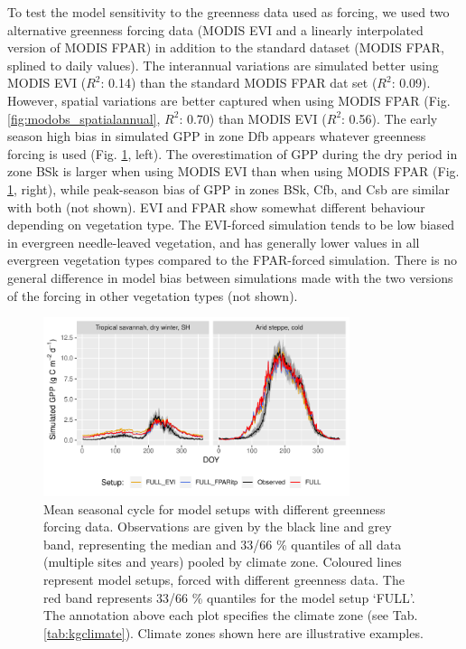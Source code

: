 \documentclass{myreport}
\newcommand{\rsq}{$R^2$}
\begin{document}
To test the model sensitivity to the greenness data used as forcing, we used two alternative greenness forcing data (MODIS EVI and a linearly interpolated version of MODIS FPAR) in addition to the standard dataset (MODIS FPAR, splined to daily values). 
The interannual variations are simulated better using MODIS EVI  (\rsq : 0.14) than the standard MODIS FPAR dat set (\rsq : 0.09). However, spatial variations are better captured when using MODIS FPAR (Fig. \ref{fig:modobs_spatialannual}, \rsq : 0.70) than MODIS EVI (\rsq : 0.56). The early season high bias in simulated GPP in zone Dfb appears whatever greenness forcing is used  (Fig. \ref{fig:season_greenness}, left). The overestimation of GPP during the dry period in zone BSk is larger when using MODIS EVI than when using MODIS FPAR (Fig. \ref{fig:season_greenness}, right), while peak-season bias of GPP in zones BSk, Cfb, and Csb are similar with both (not shown). EVI and FPAR show somewhat different behaviour depending on vegetation type. The EVI-forced simulation tends to be low biased in evergreen needle-leaved vegetation, and has generally lower values in all evergreen vegetation types compared to the FPAR-forced simulation. There is no general difference in model bias between simulations made with the two versions of the forcing in other vegetation types (not shown).

 \begin{figure}[!ht]
    \centering
\includegraphics[width=0.8\textwidth]{fig/meandoy_byzone_greenness.pdf}
    \caption{Mean seasonal cycle for model setups with different greenness forcing data. Observations are given by the black line and grey band, representing the median and 33/66 \% quantiles of all data (multiple sites and years) pooled by climate zone. Coloured lines represent model setups, forced with different greenness data. The red band represents 33/66 \% quantiles for the model setup `FULL'. The annotation above each plot specifies the climate zone (see Tab. \ref{tab:kgclimate}). Climate zones shown here are illustrative examples.}
    \label{fig:season_greenness}
\end{figure}
\end{document}
